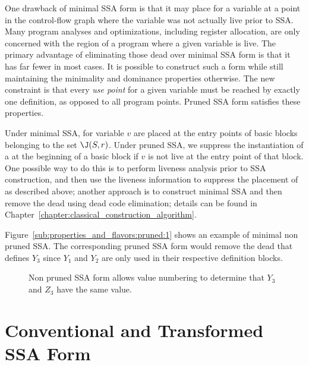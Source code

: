 One drawback of minimal SSA form is that it may place \phifuns for a variable at a point in the control-flow graph where the variable was not actually live prior to SSA. 
Many program analyses and optimizations, including register allocation, are only concerned with the region of a program where a given variable is live. 
The primary advantage of eliminating those dead \phifuns over minimal SSA form is that it has far fewer \phifuns in most cases. 
It is possible to construct such a form while still maintaining the minimality and dominance properties otherwise. 
The new constraint is that every \emph{use point} for a given variable must be reached by exactly one definition, as opposed to all program points. 
Pruned SSA form satisfies these properties.

Under minimal SSA, \phifuns for variable $v$ are placed at the entry points of basic blocks belonging to the set $\J(S,r)$. 
Under pruned SSA, we suppress the instantiation of a \phifun at the beginning of a basic block if $v$ is not live at the entry point of that block. 
One possible way to do this is to perform liveness analysis prior to SSA construction, and then use the liveness information to suppress the placement of \phifuns as described above; 
another approach is to construct minimal SSA and then remove the dead \phifuns using dead code elimination; 
details can be found in Chapter~\ref{chapter:classical_construction_algorithm}.

Figure~\ref{sub:properties_and_flavors:pruned:1} shows an example of minimal non pruned SSA. 
The corresponding pruned SSA form would remove the dead \phifun that defines $Y_3$ since $Y_1$ and $Y_2$ are only used in their respective definition blocks.

\begin{figure}
\begin{center}
\caption{Non pruned SSA form allows value numbering to determine that $Y_3$ and $Z_3$ have the same value.}
\label{fig:properties_and_flavors:pruned}
\end{center}
\end{figure}




\section{Conventional and Transformed SSA Form}
\label{sec-prop-conventional}

